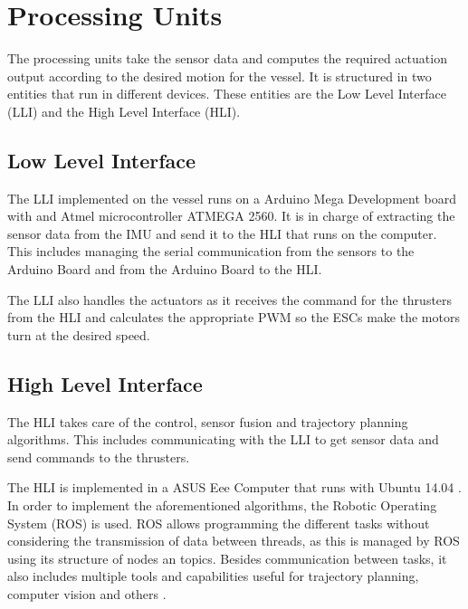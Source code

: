 \section{Processing Units}\label{sec:ControlComputation}
The processing units take the sensor data and computes the required actuation output according to the desired motion for the vessel. It is structured in two entities that run in different devices. These entities are the Low Level Interface (LLI) and the High Level Interface (HLI).

\subsection{Low Level Interface} 
The LLI implemented on the vessel runs on a Arduino Mega Development board with and Atmel microcontroller ATMEGA 2560. It is in charge of extracting the sensor data from the IMU and send it to the HLI that runs on the computer. This includes managing the serial communication from the sensors to the Arduino Board and from the Arduino Board to the HLI. 

The LLI also handles the actuators as it receives the command for the thrusters from the HLI and calculates the appropriate PWM so the ESCs make the motors turn at the desired speed.

\subsection{High Level Interface}

The HLI takes care of the control, sensor fusion and trajectory planning algorithms. This includes communicating with the LLI to get sensor data and send commands to the thrusters. 

The HLI is implemented in a ASUS Eee Computer \cite{asus} that runs with Ubuntu 14.04 \cite{ubuntu}. In order to implement the aforementioned algorithms, the Robotic Operating System (ROS) is used. ROS allows programming the different tasks without considering the transmission of data between threads, as this is managed by ROS using its structure of nodes an topics. Besides communication between tasks, it also includes multiple tools and capabilities useful for trajectory planning, computer vision and others \cite{ROS}.